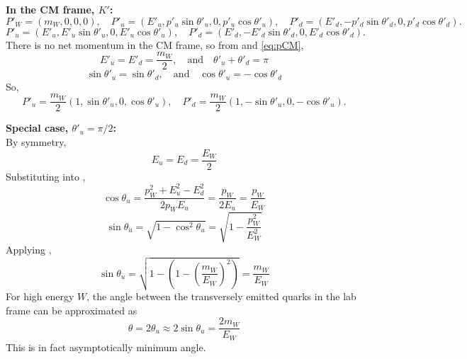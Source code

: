 \documentclass[12pt]{article}
\begin{document}

{\bf In the CM frame, $K'$:}
\begin{equation}\label{eq:pCM}
  P'_W = (m_W,0,0,0), \quad
  P'_u = (E'_u,p'_u\sin\theta'_u,0,p'_u\cos\theta'_u), \quad
  P'_d = (E'_d,-p'_d\sin\theta'_d,0,p'_d\cos\theta'_d).
\end{equation}
\begin{equation}\label{eq:pud}
  P'_u = (E'_u,E'_u\sin\theta'_u,0,E'_u\cos\theta'_u), \quad
  P'_d = (E'_d,-E'_d\sin\theta'_d,0,E'_d\cos\theta'_d).
\end{equation}
%
There is no net momentum in the CM frame, so from  and \ref{eq:pCM},
\begin{equation}
  E'_u = E'_d = \frac{m_W}{2}, \quad \text{and} \quad
  \theta'_u + \theta'_d = \pi
\end{equation}
\begin{equation}
  \sin\theta'_u = \sin\theta'_d, \quad \text{and} \quad
  \cos\theta'_u = -\cos\theta'_d
\end{equation}
%
So,
\begin{equation}\label{eq:pud2}
  P'_u = \frac{m_W}{2}(1, \sin\theta'_u,0, \cos\theta'_u), \quad
  P'_d = \frac{m_W}{2}(1,-\sin\theta'_u,0,-\cos\theta'_u).
\end{equation}

\pagebreak

{\bf Special case, $\theta'_u=\pi/2$:}\\
%
By symmetry,
\begin{equation}
  E_u = E_d = \frac{E_W}{2}%
\end{equation}
%
Substituting into ,
\begin{equation}
  \cos\theta_u = \frac{p_W^2 + E_u^2 - E_d^2}{2p_WE_u}
  = \frac{p_W}{2E_u} = \frac{p_W}{E_W}
\end{equation}
\begin{equation}
  \sin\theta_u = \sqrt{1 - \cos^2\theta_u}
  = \sqrt{1 - \frac{p_W^2}{E_W^2}}
\end{equation}
%
Applying ,
\begin{equation}
  \sin\theta_u = \sqrt{1 - \left(1 - \left(\frac{m_W}{E_W}\right)^2\right)}
  = \frac{m_W}{E_W}
\end{equation}
%
For high energy $W$, the angle between the transversely emitted quarks in the lab frame can be approximated as
\begin{equation}\label{eq:theta}
  \boxed{
    \theta = 2\theta_u \approx 2\sin\theta_u = \frac{2m_W}{E_W}
  }
\end{equation}
This is in fact asymptotically minimum angle.
\end{document}
